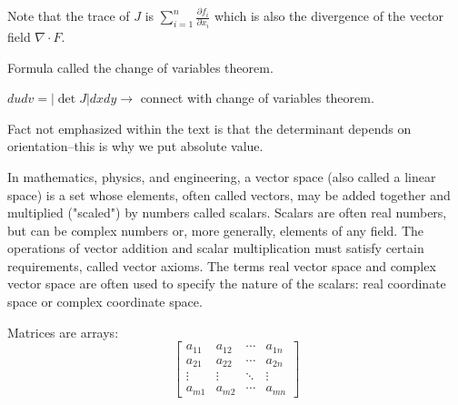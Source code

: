 \documentclass{scrreprt}
\begin{document}
\begin{remark}
	Note that the trace of $J$ is $\sum_{i=1}^{n}\frac{\partial f_i}{\partial x_i}$ which
	is also the divergence of the vector field $\nabla \cdot F$.
\end{remark}

Formula called the change of variables theorem.

$dudv=|\det J|dxdy\rightarrow $ connect with change of variables theorem.

Fact not emphasized within the text is that the determinant depends on
orientation--this is why we put absolute value.

\begin{definition}
	In mathematics, physics, and engineering, a vector space (also called a
	linear space) is a set whose elements, often called vectors, may be added 
	together and multiplied ("scaled") by numbers called scalars. 
	Scalars are often real numbers, but can be complex numbers or, more 
	generally, elements of any field. The operations of vector addition and 
	scalar multiplication must satisfy certain requirements, called vector
	axioms. The terms real vector space and complex vector space are often used 
	to specify the nature of the scalars: real coordinate space or complex coordinate space.
\end{definition}

Matrices are arrays:
\[
	\begin{bmatrix}
		a_{11} & a_{12} & \cdots & a_{1n} \\
		a_{21} & a_{22} & \cdots & a_{2n} \\
		\vdots & \vdots & \ddots & \vdots \\
		a_{m1} & a_{m2} & \cdots & a_{mn}
	\end{bmatrix}
\]
\end{document}
